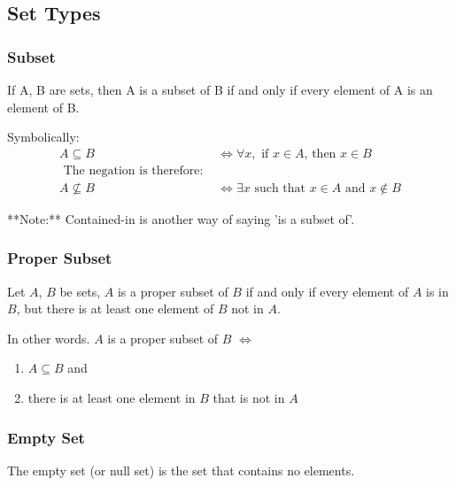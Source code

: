 \documentclass[11pt]{article}
\begin{document}
\subsection{Set Types}

\subsubsection{Subset}

\begin{definition}[Subset]\label{def:subset}
    If A, B are sets, then A is a subset of B if and only if every element of A is an element of B.

    Symbolically:
    \begin{align*}
        A \subseteq B &\iff \forall x, \text{ if $x \in A$, then $x \in B$} \\
        \text{ The negation is therefore: } & \\
        A \not \subseteq B &\iff \exists x \text{ such that $x \in A$ and $x \notin B$}
    \end{align*}

    \starON
    **Note:** Contained-in is another way of saying 'is a subset of'.
    \starOFF
\end{definition}

\subsubsection{Proper Subset}

\begin{definition}\label{def:proper-subset}
    Let $A$, $B$ be sets, $A$ is a proper subset of $B$ if and only if every element of $A$ is in $B$, but there
    is at least one element of $B$ not in $A$.

    In other words. $A$ is a proper subset of $B$ $\iff$
    \begin{enumerate}
        \item $A \subseteq B$ and
        \item there is at least one element in $B$ that is not in $A$
    \end{enumerate}
\end{definition}

\subsubsection{Empty Set}

\begin{definition}\label{def:empty-set}
    The empty set (or null set) is the set that contains no elements.
\end{definition}
\end{document}
